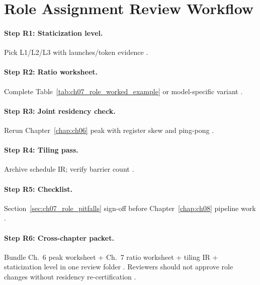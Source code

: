 \section{Role Assignment Review Workflow}
\label{sec:ch07_role_review}

\paragraph{Step R1: Staticization level.}
Pick L1/L2/L3 with launches/token evidence \citep{taxbreak2026,nvidia2024cudagraphs,mpk2025}.

\paragraph{Step R2: Ratio worksheet.}
Complete Table~\ref{tab:ch07_role_worked_example} or model-specific variant \citep{shah2024flashattention3,patel2025llminference}.

\paragraph{Step R3: Joint residency check.}
Rerun Chapter~\ref{chap:ch06} peak with register skew and ping-pong \citep{yirage2026,dao2022flashattention,chen2020compilerbasedhardw}.

\paragraph{Step R4: Tiling pass.}
Archive schedule IR; verify barrier count \citep{yirage2026,wu2024mirage,semianalysis2024tma}.

\paragraph{Step R5: Checklist.}
Section~\ref{sec:ch07_role_pitfalls} sign-off before Chapter~\ref{chap:ch08} pipeline work \citep{dao2022flashattention,patel2025llminference}.

\paragraph{Step R6: Cross-chapter packet.}
Bundle Ch.~6 peak worksheet + Ch.~7 ratio worksheet + tiling IR + staticization level in one review folder \citep{yirage2026,chen2020compilerbasedhardw,dao2022flashattention,shah2024flashattention3}.
Reviewers should not approve role changes without residency re-certification \citep{memoryfloor2026,mpk2025,yirage2026}.

